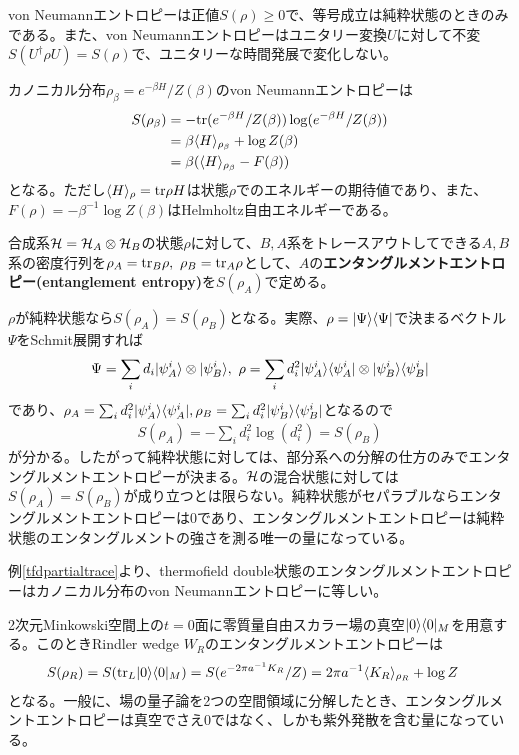 von Neumannエントロピーは正値$S(\rho)\geq 0$で、等号成立は純粋状態のときのみである。また、von Neumannエントロピーはユニタリー変換$U$に対して不変$S(U^\dagger \rho U)=S(\rho)$で、ユニタリーな時間発展で変化しない。

\begin{ex}
カノニカル分布$\rho_\beta=e^{-\beta H}/Z(\beta)$のvon Neumannエントロピーは
\begin{align}
S(\rho_\beta)&=-\textnormal{tr} (e^{-\beta H}/Z(\beta))\log(e^{-\beta H}/Z(\beta))\notag\\
&=\beta \langle H\rangle_{\rho_\beta}+\log Z(\beta)\notag\\
&=\beta (\langle H\rangle_{\rho_\beta}-F(\beta))
\end{align}
となる。ただし$\langle H\rangle_{\rho}=\textnormal{tr} \rho H$は状態$\rho$でのエネルギーの期待値であり、また、$F(\rho)=-\beta^{-1}\log Z(\beta)$はHelmholtz自由エネルギーである。
\end{ex}

\begin{oframed}
合成系$\mathcal{H}=\mathcal{H}_A\otimes \mathcal{H}_B$の状態$\rho$に対して、$B,A$系をトレースアウトしてできる$A,B$系の密度行列を$\rho_A=\textnormal{tr}_B \rho,\ \rho_B=\textnormal{tr}_A \rho$として、$A$の\textbf{エンタングルメントエントロピー(entanglement entropy)}を$S(\rho_A)$で定める。
\end{oframed}

$\rho$が純粋状態なら$S(\rho_A)=S(\rho_B)$となる。実際、$\rho=|\Psi\rangle\langle\Psi|$で決まるベクトル$\Psi$をSchmit展開すれば
\begin{align}
\Psi=\sum_{i} d_i |\psi_A^i\rangle\otimes |\psi_B^i\rangle,\ \rho=\sum_{i} d_i^2 |\psi_A^i\rangle\langle\psi_A^i|\otimes |\psi_B^i\rangle\langle\psi_B^i|
\end{align}
であり、$\rho_{A}=\sum_{i} d_i^2 |\psi_{A}^i\rangle\langle\psi_{A}^i|,\rho_{B}=\sum_{i} d_i^2 |\psi_{B}^i\rangle\langle\psi_{B}^i|$となるので
\begin{align}
S(\rho_A)=-\sum_{i} d_i^2 \log(d_i^2)=S(\rho_B)
\end{align}
が分かる。したがって純粋状態に対しては、部分系への分解の仕方のみでエンタングルメントエントロピーが決まる。$\mathcal{H}$の混合状態に対しては$S(\rho_A)=S(\rho_B)$が成り立つとは限らない。純粋状態がセパラブルならエンタングルメントエントロピーは$0$であり、エンタングルメントエントロピーは純粋状態のエンタングルメントの強さを測る唯一の量になっている。

例\ref{tfdpartialtrace}より、thermofield double状態のエンタングルメントエントロピーはカノニカル分布のvon Neumannエントロピーに等しい。
\begin{ex}
2次元Minkowski空間上の$t=0$面に零質量自由スカラー場の真空$|0\rangle\langle 0|_M$を用意する。このときRindler wedge $W_R$のエンタングルメントエントロピーは
\begin{align}
S(\rho_R)&=S(\textnormal{tr}_L |0\rangle\langle 0|_M)=S(e^{-2\pi a^{-1}K_R}/Z)=2\pi a^{-1}\langle K_R \rangle_{\rho_R}+\log Z
\end{align}
となる。一般に、場の量子論を2つの空間領域に分解したとき、エンタングルメントエントロピーは真空でさえ0ではなく、しかも紫外発散を含む量になっている。
\end{ex}



